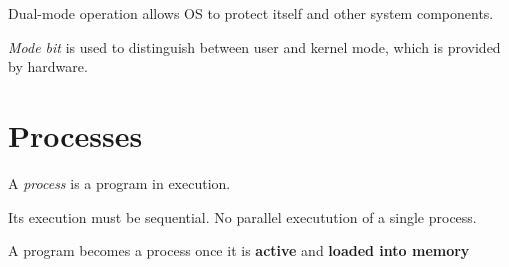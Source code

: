 \documentclass[]{article}
\begin{document}
Dual-mode operation allows OS to protect itself and other system components.

\emph{Mode bit} is used to distinguish between user and kernel mode, which is provided by hardware.

\section{Processes}

A \emph{process} is a program in execution. 

Its execution must be sequential. No parallel executution of a single process.

A program becomes a process once it is \textbf{active} and \textbf{loaded into memory} 
\end{document}
